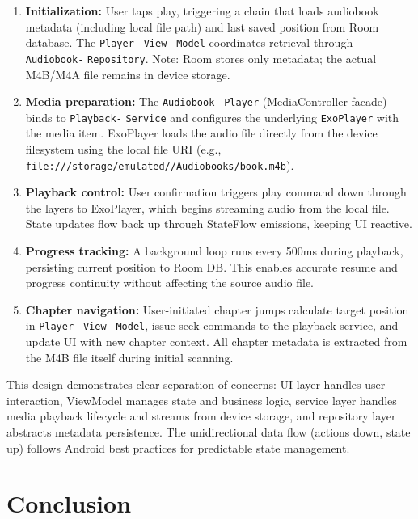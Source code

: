 \documentclass[11pt,a4paper]{article}
\begin{document}
\begin{enumerate}[noitemsep]
    \item \textbf{Initialization:} User taps play, triggering a chain that loads audiobook metadata (including local file path) and last saved position from Room database. The \texttt{Player-} \texttt{View-} \texttt{Model} coordinates retrieval through \texttt{Audiobook-} \texttt{Repository}. Note: Room stores only metadata; the actual M4B/M4A file remains in device storage.
    
    \item \textbf{Media preparation:} The \texttt{Audiobook-} \texttt{Player} (MediaController facade) binds to \texttt{Playback-} \texttt{Service} and configures the underlying \texttt{ExoPlayer} with the media item. ExoPlayer loads the audio file directly from the device filesystem using the local file URI (e.g., \texttt{file:///storage/\allowbreak emulated//\allowbreak Audiobooks/\allowbreak book.m4b}).
    
    \item \textbf{Playback control:} User confirmation triggers play command down through the layers to ExoPlayer, which begins streaming audio from the local file. State updates flow back up through StateFlow emissions, keeping UI reactive.
    
    \item \textbf{Progress tracking:} A background loop runs every 500ms during playback, persisting current position to Room DB. This enables accurate resume and progress continuity without affecting the source audio file.
    
    \item \textbf{Chapter navigation:} User-initiated chapter jumps calculate target position in \texttt{Player-} \texttt{View-} \texttt{Model}, issue seek commands to the playback service, and update UI with new chapter context. All chapter metadata is extracted from the M4B file itself during initial scanning.
\end{enumerate}

This design demonstrates clear separation of concerns: UI layer handles user interaction, ViewModel manages state and business logic, service layer handles media playback lifecycle and streams from device storage, and repository layer abstracts metadata persistence. The unidirectional data flow (actions down, state up) follows Android best practices for predictable state management.

\section{Conclusion}
\end{document}
